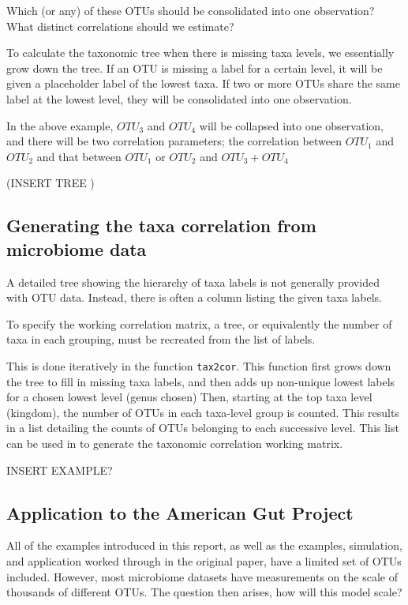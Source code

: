 \documentclass[12pt]{article}
\begin{document}
Which (or any) of these OTUs should be consolidated into one observation? What distinct correlations should we estimate?

To calculate the taxonomic tree when there is missing taxa levels, we essentially grow down the tree. If an OTU is missing a label for a certain level, it will be given a placeholder label of the lowest taxa. If two or more OTUs share the same label at the lowest level, they will be consolidated into one observation.

In the above example, $OTU_3$ and $OTU_4$ will be collapsed into one observation, and there will be two correlation parameters; the correlation between $OTU_1$ and $OTU_2$ and that between $OTU_1$ or $OTU_2$ and $OTU_3 + OTU_4$

(INSERT TREE )



\subsection{Generating the taxa correlation from microbiome data}

A detailed tree showing the hierarchy of taxa labels is not generally provided with OTU data. Instead, there is often a column listing the given taxa labels.

To specify the working correlation matrix, a tree, or equivalently the number of taxa in each grouping, must be recreated from the list of labels.

This is done iteratively in the function \texttt{tax2cor}. This function first grows down the tree to fill in missing taxa labels, and then adds up non-unique lowest labels for a chosen lowest level (genus chosen) Then, starting at the top taxa level (kingdom), the number of OTUs in each taxa-level group is counted.
This results in a list detailing the counts of OTUs belonging to each successive level. This list can be used in to generate the taxonomic correlation working matrix.

INSERT EXAMPLE?


\subsection{Application to the American Gut Project}

All of the examples introduced in this report, as well as the examples, simulation, and application worked through in the original paper, have a limited set of OTUs included. However, most microbiome datasets have measurements on the scale of thousands of different OTUs. The question then arises, how will this model scale?
\end{document}
